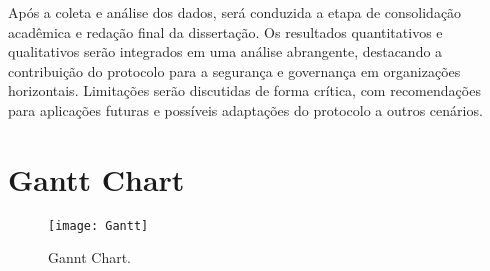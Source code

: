 Após a coleta e análise dos dados, será conduzida a etapa de consolidação
acadêmica e redação final da dissertação. Os resultados quantitativos e
qualitativos serão integrados em uma análise abrangente, destacando a
contribuição do protocolo para a segurança e governança em organizações
horizontais. Limitações serão discutidas de forma crítica, com recomendações
para aplicações futuras e possíveis adaptações do protocolo a outros cenários.

\section{Gantt Chart}
\label{sec:gantt_chart}


\begin{figure}[htbp]
  \centering
  \texttt{[image: Gantt]}
  \caption{Gannt Chart.}
  \label{fig:Gannt}
\end{figure}